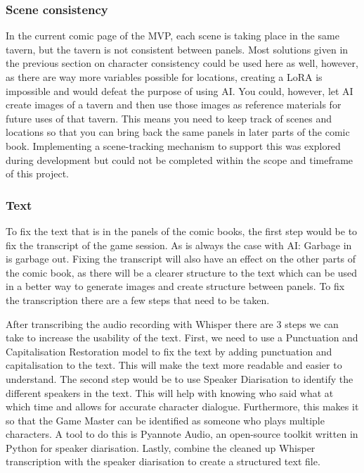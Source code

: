 \subsubsection{Scene consistency}
In the current comic page of the MVP, each scene is taking place in the same tavern, but the tavern is not consistent between panels. Most solutions given in the previous section on character consistency could be used here as well, however, as there are way more variables possible for locations, creating a LoRA is impossible and would defeat the purpose of using AI. You could, however, let AI create images of a tavern and then use those images as reference materials for future uses of that tavern. This means you need to keep track of scenes and locations so that you can bring back the same panels in later parts of the comic book. Implementing a scene-tracking mechanism to support this was explored during development but could not be completed within the scope and timeframe of this project.

\subsubsection{Text}
To fix the text that is in the panels of the comic books, the first step would be to fix the transcript of the game session. As is always the case with AI: Garbage in is garbage out. Fixing the transcript will also have an effect on the other parts of the comic book, as there will be a clearer structure to the text which can be used in a better way to generate images and create structure between panels. To fix the transcription there are a few steps that need to be taken.

After transcribing the audio recording with Whisper there are 3 steps we can take to increase the usability of the text. First, we need to use a Punctuation and Capitalisation Restoration model to fix the text by adding punctuation and capitalisation to the text. This will make the text more readable and easier to understand. The second step would be to use Speaker Diarisation to identify the different speakers in the text. This will help with knowing who said what at which time and allows for accurate character dialogue. Furthermore, this makes it so that the Game Master can be identified as someone who plays multiple characters. A tool to do this is Pyannote Audio, an open-source toolkit written in Python for speaker diarisation. Lastly, combine the cleaned up Whisper transcription with the speaker diarisation to create a structured text file.

